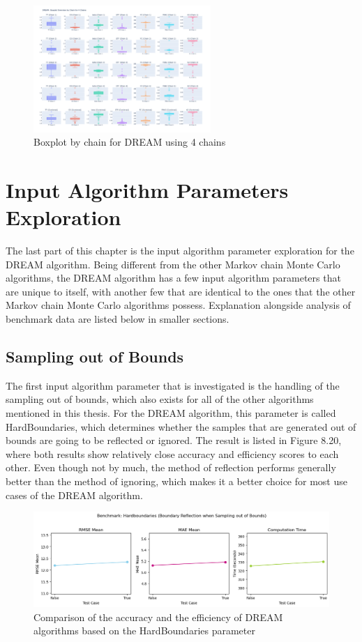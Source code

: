 \begin{figure}[H]
    \centering
    \includegraphics[width=0.6\textwidth]{figures/dream/boxplot_4.png}
    \captionsetup{width=.8\textwidth}
    \caption{Boxplot by chain for DREAM using 4 chains}
    \label{fig:enter-label}
\end{figure}

\section{Input Algorithm Parameters Exploration}
The last part of this chapter is the input algorithm parameter exploration for the DREAM algorithm. Being different from the other Markov chain Monte Carlo algorithms, the DREAM algorithm has a few input algorithm parameters that are unique to itself, with another few that are identical to the ones that the other Markov chain Monte Carlo algorithms possess. Explanation alongside analysis of benchmark data are listed below in smaller sections. 

\subsection{Sampling out of Bounds}
The first input algorithm parameter that is investigated is the handling of the sampling out of bounds, which also exists for all of the other algorithms mentioned in this thesis. For the DREAM algorithm, this parameter is called HardBoundaries, which determines whether the samples that are generated out of bounds are going to be reflected or ignored. The result is listed in Figure 8.20, where both results show relatively close accuracy and efficiency scores to each other. Even though not by much, the method of reflection performs generally better than the method of ignoring, which makes it a better choice for most use cases of the DREAM algorithm.

\begin{figure}[H]
    \centering
    \includegraphics[width=1\textwidth]{figures/dream/sotb.png}
    \captionsetup{width=.8\textwidth}
    \caption{Comparison of the accuracy and the efficiency of DREAM algorithms based on the HardBoundaries parameter}
    \label{fig:enter-label}
\end{figure}

